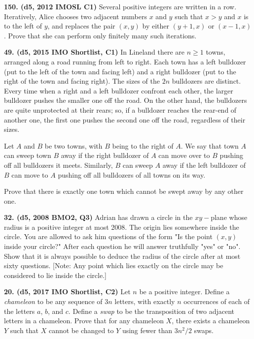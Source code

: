 \documentclass{article}
\begin{document}
        \textbf{150. (\color{red}d5\color{black}, 2012 IMOSL C1)} Several positive integers are written in a row. Iteratively, Alice chooses two adjacent numbers \(x\) and \(y\) such that \(x > y\) and \(x\) is to the left of \(y\), and replaces the pair \((x,y)\) by either \((y + 1,x)\) or \((x - 1,x)\). Prove that she can perform only finitely many such iterations.

        \textbf{49. (\color{red}d5\color{black}, 2015 IMO Shortlist, C1)} In Lineland there are \(n \geq 1\) towns, arranged along a road running from left to right. Each town has a left bulldozer (put to the left of the town and facing left) and a right bulldozer (put to the right of the town and facing right). The sizes of the \(2n\) bulldozers are distinct. Every time when a right and a left bulldozer confront each other, the larger bulldozer pushes the smaller one off the road. On the other hand, the bulldozers are quite unprotected at their rears; so, if a bulldozer reaches the rear-end of another one, the first one pushes the second one off the road, regardless of their sizes.

        \quad Let \(A\) and \(B\) be two towns, with \(B\) being to the right of \(A\). We say that town \(A\) can sweep town \(B\) away if the right bulldozer of \(A\) can move over to \(B\) pushing off all bulldozers it meets. Similarly, \(B\) can sweep \(A\) away if the left bulldozer of \(B\) can move to \(A\) pushing off all bulldozers of all towns on its way.

        \quad Prove that there is exactly one town which cannot be swept away by any other one.

        \textbf{32. (\color{red}d5\color{black}, 2008 BMO2, Q3)} Adrian has drawn a circle in the $xy-$plane whose radius is a positive integer at most 2008. The origin lies somewhere inside the circle. You are allowed to ask him questions of the form "Is the point $(x,y)$ inside your circle?" After each question he will answer truthfully "yes" or "no". Show that it is always possible to deduce the radius of the circle after at most sixty questions. [Note: Any point which lies exactly on the circle may be considered to lie inside the circle.]

        \textbf{20. (\color{red}d5\color{black}, 2017 IMO Shortlist, C2)} Let $n$ be a positive integer. Define a \emph{chameleon} to be any sequence of $3n$ letters, with exactly $n$ occurrences of each of the letters $a$, $b$, and $c$. Define a \emph{swap} to be the transposition of two adjacent letters in a chameleon. Prove that for any chameleon $X$, there exists a chameleon $Y$ such that $X$ cannot be changed to $Y$ using fewer than $3n^2/2$ swaps.
\end{document}
